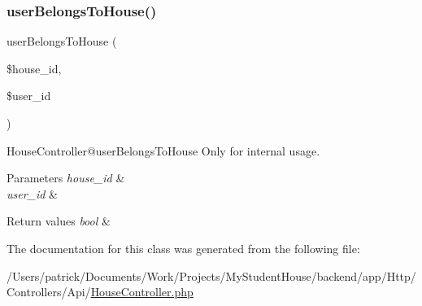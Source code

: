 \subsubsection{\texorpdfstring{userBelongsToHouse()}{userBelongsToHouse()}}
{\footnotesize\ttfamily user\+Belongs\+To\+House (\begin{DoxyParamCaption}\item[{}]{\$house\+\_\+id,  }\item[{}]{\$user\+\_\+id }\end{DoxyParamCaption})}

\begin{DoxyParagraph}{House\+Controller@user\+Belongs\+To\+House}
Only for internal usage.
\end{DoxyParagraph}

\begin{DoxyParams}{Parameters}
{\em house\+\_\+id} & \\
\hline
{\em user\+\_\+id} & \\
\hline
\end{DoxyParams}

\begin{DoxyRetVals}{Return values}
{\em bool} & \\
\hline
\end{DoxyRetVals}


The documentation for this class was generated from the following file\+:\begin{DoxyCompactItemize}
\item 
/\+Users/patrick/\+Documents/\+Work/\+Projects/\+My\+Student\+House/backend/app/\+Http/\+Controllers/\+Api/\mbox{\hyperlink{_house_controller_8php}{House\+Controller.\+php}}\end{DoxyCompactItemize}
